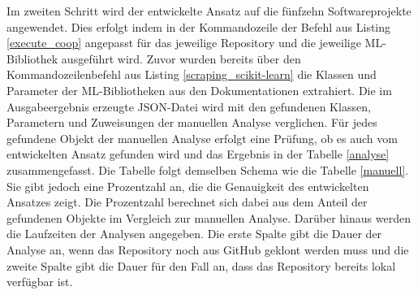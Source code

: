 \documentclass[german,bachelor]{swsLeipzig}
\begin{document}
\noindent Im zweiten Schritt wird der entwickelte Ansatz auf die fünfzehn Softwareprojekte angewendet.
Dies erfolgt indem in der Kommandozeile der Befehl aus Listing \ref{execute_coop} angepasst für das jeweilige Repository und die
jeweilige ML-Bibliothek ausgeführt wird.
Zuvor wurden bereits über den Kommandozeilenbefehl aus Listing \ref{scraping_scikit-learn} die Klassen und Parameter
der ML-Bibliotheken aus den Dokumentationen extrahiert.
Die im Ausgabeergebnis erzeugte JSON-Datei wird mit den gefundenen Klassen, Parametern und Zuweisungen der manuellen
Analyse verglichen.
Für jedes gefundene Objekt der manuellen Analyse erfolgt eine Prüfung, ob es auch vom entwickelten Ansatz gefunden wird und
das Ergebnis in der Tabelle \ref{analyse} zusammengefasst.
Die Tabelle folgt demselben Schema wie die Tabelle \ref{manuell}.
Sie gibt jedoch eine Prozentzahl an, die die Genauigkeit des entwickelten Ansatzes zeigt.
Die Prozentzahl berechnet sich dabei aus dem Anteil der gefundenen Objekte im Vergleich zur manuellen Analyse.
Darüber hinaus werden die Laufzeiten der Analysen angegeben.
Die erste Spalte gibt die Dauer der Analyse an, wenn das Repository noch aus GitHub geklont werden muss und die zweite Spalte
gibt die Dauer für den Fall an, dass das Repository bereits lokal verfügbar ist.
\end{document}
